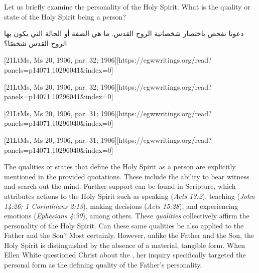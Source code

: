 Let us briefly examine the personality of the Holy Spirit. What is the quality or state of the Holy Spirit being a person?


دعونا نفحص باختصار شخصانية الروح القدس. ما هي الصفة أو الحالة التي يكون بها الروح القدس شخصًا؟


[21LtMs, Ms 20, 1906, par. 32; 1906][https://egwwritings.org/read?panels=p14071.10296041&index=0]


[21LtMs, Ms 20, 1906, par. 32; 1906][https://egwwritings.org/read?panels=p14071.10296041&index=0]


[21LtMs, Ms 20, 1906, par. 31; 1906][https://egwwritings.org/read?panels=p14071.10296040&index=0]


[21LtMs, Ms 20, 1906, par. 31; 1906][https://egwwritings.org/read?panels=p14071.10296040&index=0]


The qualities or states that define the Holy Spirit as a person are explicitly mentioned in the provided quotations. These include the ability to bear witness and search out the mind. Further support can be found in Scripture, which attributes actions to the Holy Spirit such as speaking (\textit{Acts 13:2}), teaching (\textit{John 14:26; 1 Corinthians 2:13}), making decisions (\textit{Acts 15:28}), and experiencing emotions (\textit{Ephesians 4:30}), among others. These \textit{qualities }collectively affirm the personality of the Holy Spirit. Can these same qualities be also applied to the Father and the Son? Most certainly. However, unlike the Father and the Son, the Holy Spirit is distinguished by the absence of a material, tangible form. When Ellen White questioned Christ about the , her inquiry specifically targeted the personal form as the defining quality of the Father's personality.


